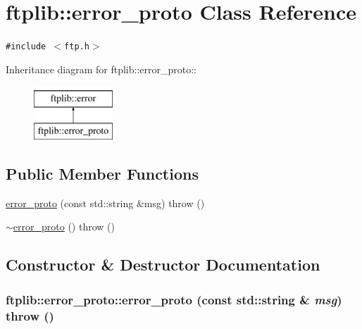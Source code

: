 \hypertarget{classftplib_1_1error__proto}{
\section{ftplib::error\_\-proto Class Reference}
\label{classftplib_1_1error__proto}
}
{\tt \#include $<$ftp.h$>$}

Inheritance diagram for ftplib::error\_\-proto::\begin{figure}[H]
\begin{center}
\leavevmode
\includegraphics[height=2cm]{classftplib_1_1error__proto}
\end{center}
\end{figure}
\subsection*{Public Member Functions}
\begin{CompactItemize}
\item 
\hyperlink{classftplib_1_1error__proto_4d9a71a8162f838cb1cdd2997f64819b}{error\_\-proto} (const std::string \&msg)  throw ()
\item 
\hyperlink{classftplib_1_1error__proto_3f80b3d7cb39a1725f917ae3383c75df}{$\sim$error\_\-proto} ()  throw ()
\end{CompactItemize}


\subsection{Constructor \& Destructor Documentation}
\hypertarget{classftplib_1_1error__proto_4d9a71a8162f838cb1cdd2997f64819b}{
\subsubsection[{error\_\-proto}]{\setlength{\rightskip}{0pt plus 5cm}ftplib::error\_\-proto::error\_\-proto (const std::string \& {\em msg})  throw ()}}
\label{classftplib_1_1error__proto_4d9a71a8162f838cb1cdd2997f64819b}


